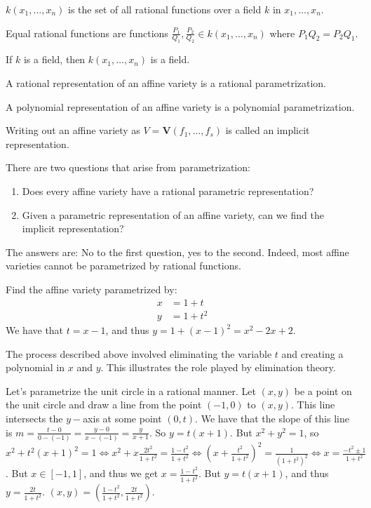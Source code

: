\documentclass[crop=false,class=book]{standalone}
\begin{document}
\begin{definition}
$k(x_1,\hdots ,x_n)$ is the set of all rational functions over a field $k$ in $x_1,\hdots, x_n$.
\end{definition}
\begin{definition}
Equal rational functions are functions $\frac{P_1}{Q_1}, \frac{P_2}{Q_2} \in k(x_1,\hdots ,x_n)$ where $P_1Q_2 = P_2Q_1$.
\end{definition}
\begin{theorem}
If $k$ is a field, then $k(x_1,\hdots ,x_n)$ is a field.
\end{theorem}
\begin{definition}
A rational representation of an affine variety is a rational parametrization.
\end{definition}
\begin{definition}
A polynomial representation of an affine variety is a polynomial parametrization.
\end{definition}
\begin{remark}
Writing out an affine variety as $V=\mathbf{V}(f_{1},\hdots,f_{s})$ is called an implicit representation.
\end{remark}
There are two questions that arise from parametrization:
\begin{enumerate}
    \item Does every affine variety have a rational parametric representation?
    \item Given a parametric representation of an affine variety, can we find the implicit representation?
\end{enumerate}
The answers are: No to the first question, yes to the second. Indeed, most affine varieties cannot be parametrized by rational functions.
\begin{example}
Find the affine variety parametrized by:
\begin{align*}
    x&=1+t\\
    y&=1+t^{2}
\end{align*}
We have that $t=x-1$, and thus $y=1+(x-1)^{2}=x^{2}-2x+2$.
\end{example}
\begin{remark}
The process described above involved eliminating the variable $t$ and creating a polynomial in $x$ and $y$. This illustrates the role played by elimination theory.
\end{remark}
\begin{example}
Let's parametrize the unit circle in a rational manner. Let $(x,y)$ be a point on the unit circle and draw a line from the point $(-1,0)$ to $(x,y)$. This line intersects the $y-$axis at some point $(0,t)$. We have that the slope of this line is $m =\frac{t-0}{0-(-1)}=\frac{y-0}{x-(-1)}=\frac{y}{x+1}$. So $y=t(x+1)$. But $x^{2}+y^{2}=1$, so $x^2+t^{2}(x+1)^{2}=1\Leftrightarrow x^{2}+x\frac{2t^{2}}{1+t^{2}}=\frac{1-t^2}{1+t^2}\Leftrightarrow (x+\frac{t^{2}}{1+t^{2}})^{2}=\frac{1}{(1+t^{2})^{2}}\Leftrightarrow x=\frac{-t^{2}\pm 1}{1+t^{2}}$. But $x\in [-1,1]$, and thus we get $x = \frac{1-t^2}{1+t^2}$. But $y = t(x+1)$, and thus $y = \frac{2t}{1+t^2}$. $(x,y)=(\frac{1-t^{2}}{1+t^{2}},\frac{2t}{1+t^{2}})$.
\end{example}
\end{document}
